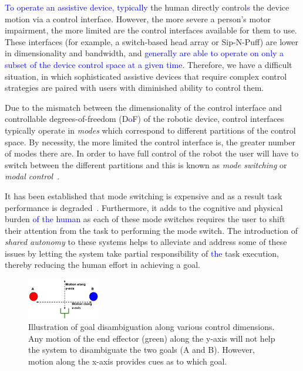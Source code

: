 \documentclass[conference]{IEEEtran}
\begin{document}
\textcolor{blue}{To operate an assistive device, typically} the human directly control\textcolor{blue}{s} the device motion via a control interface. However, the more severe a person's motor impairment, the more limited are the control interfaces available for them to use. These interfaces (for example, a switch-based head array or Sip-N-Puff) are lower in dimensionality and bandwidth, and \textcolor{blue}{generally are able to operate on only a subset of the device control space at a given time}. Therefore, we have a difficult situation, in which sophisticated assistive devices that require complex control strategies are paired with users with diminished ability to control them.

Due to the mismatch between the dimensionality of the control interface and controllable degrees-of-freedom (D\textcolor{blue}{o}F) of the robotic device, control interfaces typically operate in \textit{modes} which correspond to different partitions of the control space. By necessity, the more limited the control interface is, the greater number of modes there are. In order to have full control of the robot the user will have to switch between the different partitions and this is known as \textit{mode switching} or \textit{modal control}~\cite{nuttin2002selection,tsui2008development}. 

It has been established that mode switching is expensive and as a result task performance is degraded~\cite{herlant2016assistive}. Furthermore, it adds to the cognitive and physical burden \textcolor{blue}{of the human} as each of these mode switches requires the user to shift their attention from the task to performing the mode switch. The introduction of \textit{shared autonomy} to these systems helps to alleviate and address some of these issues by letting the system take partial responsibility of \textcolor{blue}{the} task execution, thereby reducing the human effort in achieving a goal. 
\begin{figure}[b]
	\begin{center}
		\includegraphics[width=0.285\textwidth]{./figures/DE_NEW3.png}
	\end{center}
	\caption{Illustration of goal disambiguation along various control dimensions. Any motion of the end effector (green) along the y-axis will not help the system to disambiguate the two goals (A and B). However, motion along the x-axis provides cues as to which goal.}
	\label{DE}
\end{figure}
\end{document}
